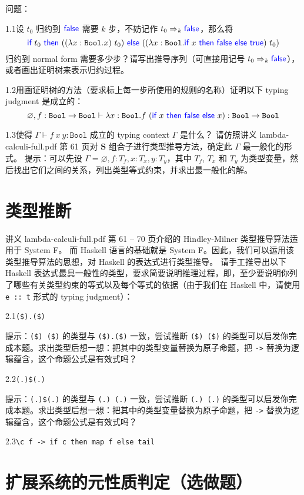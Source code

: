 \documentclass[11pt, a4paper]{article}
\newcommand{\hei}{\CJKfamily{hei}}
\newcommand{\kai}{\CJKfamily{kai}}
\let\t\texttt
\let\emptyset\varnothing
\let\to\rightarrow
\let\reduce\Rightarrow
\newcommand{\Bool}{\t{Bool}}
\newcommand{\kword}[1]{{\color{blue} \textsf{#1}}}
\newcommand{\True}{\kword{true}}
\newcommand{\False}{\kword{false}}
\newcommand{\If}{\kword{if}}
\newcommand{\Then}{\kword{then}}
\newcommand{\Else}{\kword{else}}
\begin{document}
{\hei 问题：}

1.1\quad 设 $t_0$ 归约到 $\False$ 需要 $k$ 步，不妨记作 $t_0 \reduce_k \False$，那么将 
$$\If~t_0~\Then~((\lambda x:\Bool.x)~t_0)~\Else~((\lambda x:\Bool.\If~x~\Then~\False~\Else~\True)~t_0)$$
归约到 normal form 需要多少步？请写出推导序列（可直接用记号 $t_0 \reduce_k \False$），或者画出证明树来表示归约过程。

1.2\quad 用画证明树的方法（要求标上每一步所使用的规则的名称）证明以下 typing judgment 是成立的：
$$\emptyset, f:\Bool \to \Bool \vdash \lambda x:\Bool.f~(\If~x~\Then~\False~\Else~x) : \Bool \to \Bool$$

1.3\quad 使得 $\Gamma \vdash f~x~y:\Bool$ 成立的 typing context $\Gamma$ 是什么？
请仿照讲义 lambda-calculi-full.pdf 第 61 页对 $\mathbf{S}$ 组合子进行类型推导方法，确定此 $\Gamma$ 最一般化的形式。
{\kai 提示：可以先设 $\Gamma=\emptyset,f:T_f,x:T_x,y:T_y$，其中 $T_f$, $T_x$ 和 $T_y$ 为类型变量，然后找出它们之间的关系，列出类型等式约束，并求出最一般化的解。}

\section{类型推断}

讲义 lambda-calculi-full.pdf 第 61 -- 70 页介绍的 Hindley-Milner 类型推导算法适用于 System F。
而 Haskell 语言的基础就是 System F。因此，我们可以运用该类型推导算法的思想，对 Haskell 的表达式进行类型推导。
请手工推导出以下 Haskell 表达式最具一般性的类型，要求简要说明推理过程，即，至少要说明你列了哪些有关类型约束的等式以及每个等式的依据（由于我们在 Haskell 中，请使用 \t{e :: t} 形式的 typing judgment）：

2.1\quad \t{(\$).(\$)}

{\kai 提示：\t{(\$) (\$)} 的类型与 \t{(\$).(\$)} 一致，尝试推断 \t{(\$) (\$)} 的类型可以启发你完成本题。求出类型后想一想：把其中的类型变量替换为原子命题，把 \t{->} 替换为逻辑蕴含，这个命题公式是有效式吗？}

2.2\quad \t{(.)\$(.)}

{\kai 提示：\t{(.)\$(.)} 的类型与 \t{(.) (.)} 一致，尝试推断 \t{(.) (.)} 的类型可以启发你完成本题。求出类型后想一想：把其中的类型变量替换为原子命题，把 \t{->} 替换为逻辑蕴含，这个命题公式是有效式吗？}

2.3\quad \t{\textbackslash c f -> if c then map f else tail}

\section{扩展系统的元性质判定（选做题）}
\end{document}
